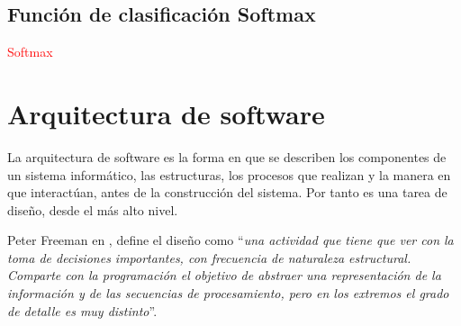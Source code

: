 %     
%     
%

            
    \subsection{Función de clasificación Softmax}
    \label{sub:FrameSoftmax}
    \textcolor{red}{Softmax}
        
\section{Arquitectura de software}
\label{sec:FrameSwArchitecture}
        La arquitectura de software es la forma en que se describen los componentes de un sistema informático, las estructuras, los procesos que realizan y la manera en que interactúan, antes de la construcción del sistema. Por tanto es una tarea de diseño, desde el más alto nivel.
    
        Peter Freeman en \cite{Freeman1980}, define el diseño como ``\textit{una actividad que tiene que ver con la toma de decisiones importantes, con frecuencia de naturaleza estructural. Comparte con la programación el objetivo de abstraer una representación de la información y de las secuencias de procesamiento, pero en los extremos el grado de detalle es muy distinto}''.
        

